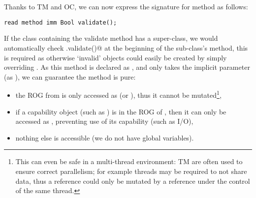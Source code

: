 \section{}
\label{s:validate}
Thanks to TM and OC, we can now express the signature for \validate{} method as follows:
\saveSpace
\begin{lstlisting}
read method imm Bool validate();
\end{lstlisting}
\saveSpace
If the class containing the validate method has a super-class, we would automatically check \Q@super.validate()@ at the beginning of the sub-class’s \validate{} method, this is required as otherwise `invalid' objects could easily be created by simply overriding \validate.
As this method is declared as \Q@read@, and only takes the implicit parameter \Q@this@ (as \Q@read@), we can guarantee the method is pure:
\begin{itemize}
\item the ROG from \Q@this@ is only accessed as \Q@read@ (or \Q@imm@), thus it cannot be mutated\footnote{
This can even be safe in a multi-thread environment: TM are often used to ensure correct parallelism; for example threads may be required to not share \Q@mut@ data, thus a \Q@read@ reference could only be mutated by a \Q@mut@ reference under the control of the same thread.
},
\item if a capability object (such as \Q@System@) is in the ROG of \Q@this@, then it can only be accessed as \Q@read@, preventing use of its capability (such as I/O),
\item nothing else is accessible (we do not have global variables).
\end{itemize}

\noindent {}


